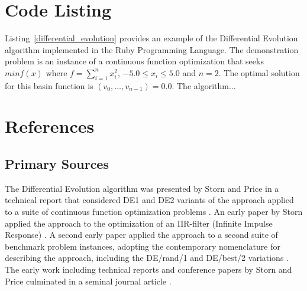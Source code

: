 \documentclass[a4paper, 11pt]{article}
\begin{document}
\section{Code Listing}
\label{sec:code}
Listing~\ref{differential_evolution} provides an example of the Differential Evolution algorithm implemented in the Ruby Programming Language.
The demonstration problem is an instance of a continuous function optimization that seeks $min f(x)$ where $f=\sum_{i=1}^n x_{i}^2$, $-5.0\leq x_i \leq 5.0$ and $n=2$. The optimal solution for this basin function is $(v_0,\ldots,v_{n-1})=0.0$.
The algorithm...




\section{References}
\label{sec:references}

% 
% 
\subsection{Primary Sources}
The Differential Evolution algorithm was presented by Storn and Price in a technical report that considered DE1 and DE2 variants of the approach applied to a suite of continuous function optimization problems \cite{Storn1995}. 
An early paper by Storn applied the approach to the optimization of an IIR-filter (Infinite Impulse Response) \cite{Storn1996a}. A second early paper applied the approach to a second suite of benchmark problem instances, adopting the contemporary nomenclature for describing the approach, including the DE/rand/1 and DE/best/2 variations \cite{Storn1996b}.
The early work including technical reports and conference papers by Storn and Price culminated in a seminal journal article \cite{Storn1997}.
\end{document}
